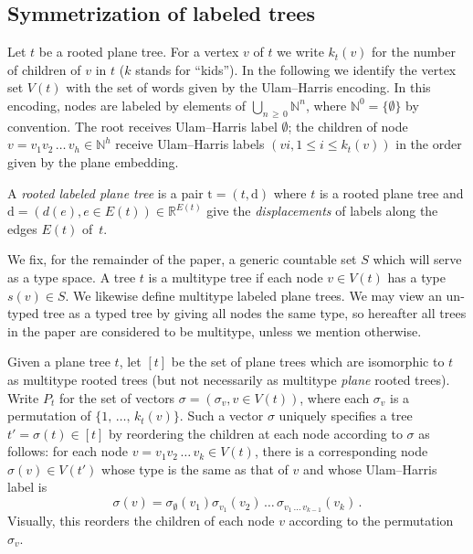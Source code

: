 \documentclass[10pt]{amsart}
\theoremstyle{definition}\newtheorem{defi}[theo]{Definition}\newtheorem{rema}[theo]{Remark}\newtheorem{exam}[theo]{Example}\newtheorem{exem}[theo]{Example}\newtheorem{nota}[theo]{Notation}
\providecommand{\R}{}
\providecommand{\N}{}
\renewcommand{\R}{\mathbb{R}}
\renewcommand{\N}{\mathbb{N}}
\newcommand{\frkS}{\mathfrak{S}}
\newcommand{\rd}{\mathrm{d}}
\newcommand{\rt}{\mathrm{t}}
\newcommand{\Permvecs}{P}
\begin{document}
\subsection{Symmetrization of labeled trees}
Let $t$ be a rooted plane tree. For a vertex $v$ of $t$ we write $k_t(v)$
 for the number of children of $v$ in $t$ ($k$ stands for ``kids''). In the following we identify the vertex set $V(t)$ with the set of words given by the Ulam--Harris encoding. In this encoding, nodes are labeled by elements of $\bigcup_{n\,\ge\,0} \N^n$, where $\N^0=\{\emptyset\}$ by convention. The root receives Ulam--Harris label $\emptyset$; the children of node $v=v_1v_2\,\ldots\,v_h \in \N^h$ receive Ulam--Harris labels $(vi,1 \le i \le k_t(v))$ in the order given by the plane embedding.


A \emph{rooted labeled plane tree} is a pair $\rt=(t,\rd)$ where $t$ is a rooted plane tree and $\rd=(d(e),e \in E(t)) \in \R^{E(t)}$
 give the \emph{displacements} of labels along the edges $E(t)$ of~$t$.


We fix, for the remainder of the paper, a generic countable set $S$ which will serve as a type space. A tree $t$ is a multitype tree if each node $v \in V(t)$ has a type $s(v) \in S$.
 We likewise define multitype labeled plane trees. We may view an un-typed tree as a typed tree by giving all nodes the same type, so hereafter all trees in the paper are considered to be multitype, unless we mention otherwise.

Given a plane tree $t$, let $[t]$
 be the set of plane trees which are isomorphic to $t$ as multitype rooted trees (but not necessarily as multitype \emph{plane} rooted trees). Write $\Permvecs_t$
\nomenclature[Pt]{$\Permvecs_t$}{Set of vectors $(\sigma_v,v\in V(t))$, each $\sigma_v \in \frkS_{k_t(v)}$} for the set of vectors $\sigma=(\sigma_v, v \in V(t))$, where each $\sigma_v$ is a permutation of $\{1,\,\ldots,\,k_t(v)\}$. Such a vector $\sigma$ uniquely specifies a tree $t'=\sigma(t) \in [t]$
 by reordering the children at each node according to $\sigma$ as follows: for each node $v=v_1v_2\,\ldots\,v_k \in V(t)$, there is a corresponding node $\sigma(v) \in V(t')$
 whose type is the same as that of $v$ and whose Ulam--Harris label is
\[
\sigma(v)=\sigma_\emptyset(v_1)\sigma_{v_1}(v_2)\,\ldots\, \sigma_{v_1\,\ldots\,v_{k-1}}(v_k)\,.
\]
Visually, this reorders the children of each node $v$ according to the permutation $\sigma_v$.
\end{document}
